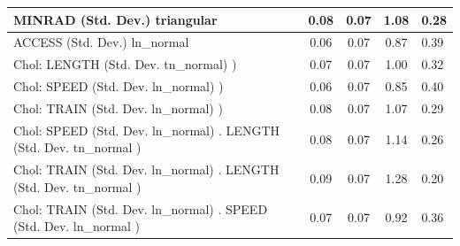 \begin{table}
\begin{center}
\begin{tabular}{|l|l|c|c|c|l|}
			\hline
			MINRAD (Std. Dev.) triangular &  & 0.08 & 0.07 & 1.08 & 0.28 \\
			\hline
			ACCESS (Std. Dev.) ln_normal &  & 0.06 & 0.07 & 0.87 & 0.39 \\
			\hline
			 Chol: LENGTH (Std. Dev. tn_normal) ) &  & 0.07 & 0.07 & 1.00 & 0.32 \\
			\hline
			 Chol: SPEED (Std. Dev. ln_normal) ) &  & 0.06 & 0.07 & 0.85 & 0.40 \\
			\hline
			 Chol: TRAIN (Std. Dev. ln_normal) ) &  & 0.08 & 0.07 & 1.07 & 0.29 \\
			\hline
			 Chol: SPEED (Std. Dev. ln_normal) . LENGTH (Std. Dev.   tn_normal ) &  & 0.08 & 0.07 & 1.14 & 0.26 \\
			\hline
			 Chol: TRAIN (Std. Dev. ln_normal) . LENGTH (Std. Dev.   tn_normal ) &  & 0.09 & 0.07 & 1.28 & 0.20 \\
			\hline
			 Chol: TRAIN (Std. Dev. ln_normal) . SPEED (Std. Dev.   ln_normal ) &  & 0.07 & 0.07 & 0.92 & 0.36 \\
			\hline
		\end{tabular}
	\end{center}
\end{table}